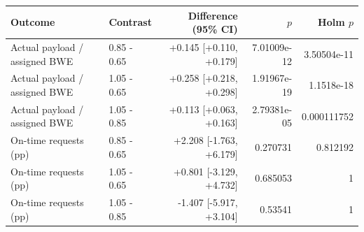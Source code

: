 \begin{tabular}{llrrr}
\toprule
Outcome & Contrast & Difference (95\% CI) & $p$ & Holm $p$ \\
\midrule
Actual payload / assigned BWE & 0.85 - 0.65 & +0.145 [+0.110, +0.179] & 7.01009e-12 & 3.50504e-11 \\
Actual payload / assigned BWE & 1.05 - 0.65 & +0.258 [+0.218, +0.298] & 1.91967e-19 & 1.1518e-18 \\
Actual payload / assigned BWE & 1.05 - 0.85 & +0.113 [+0.063, +0.163] & 2.79381e-05 & 0.000111752 \\
On-time requests (pp) & 0.85 - 0.65 & +2.208 [-1.763, +6.179] & 0.270731 & 0.812192 \\
On-time requests (pp) & 1.05 - 0.65 & +0.801 [-3.129, +4.732] & 0.685053 & 1 \\
On-time requests (pp) & 1.05 - 0.85 & -1.407 [-5.917, +3.104] & 0.53541 & 1 \\
\bottomrule
\end{tabular}
